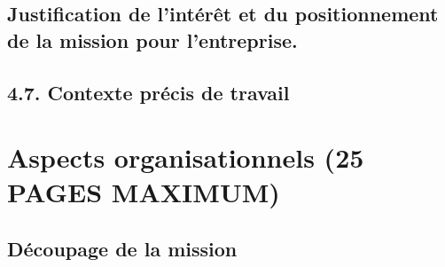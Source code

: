 \documentclass[a4paper, 12pt]{article}
\begin{document}
    
    \newpage{}


\subsection{Justification de l’intérêt et du positionnement de la mission pour l’entreprise.}

    
    \newpage{}

\subsection{4.7. Contexte précis de travail}


    
    \newpage{}


\section{Aspects organisationnels (25 PAGES MAXIMUM)}


\subsection{Découpage de la mission}

\end{document}
